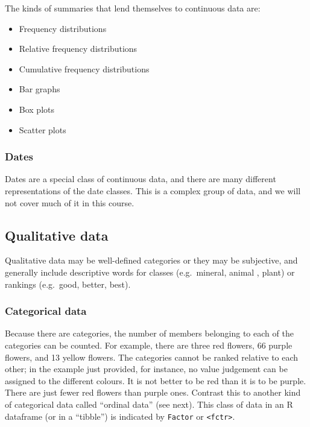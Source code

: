 \documentclass[english,10pt,a4paper,oneside]{book}
\providecommand{\tightlist}{%
  \setlength{\itemsep}{0pt}\setlength{\parskip}{0pt}}
\theoremstyle{definition}
\theoremstyle{definition}
\theoremstyle{definition}
\theoremstyle{remark}
\begin{document}
The kinds of summaries that lend themselves to continuous data are:

\begin{itemize}
\tightlist
\item
  Frequency distributions
\item
  Relative frequency distributions
\item
  Cumulative frequency distributions
\item
  Bar graphs
\item
  Box plots
\item
  Scatter plots
\end{itemize}

\subsubsection{Dates}\label{dates}

Dates are a special class of continuous data, and there are many
different representations of the date classes. This is a complex group
of data, and we will not cover much of it in this course.

\subsection{Qualitative data}\label{qualitative-data}

Qualitative data may be well-defined categories or they may be
subjective, and generally include descriptive words for classes
(e.g.~mineral, animal , plant) or rankings (e.g.~good, better, best).

\subsubsection{Categorical data}\label{categorical-data}

Because there are categories, the number of members belonging to each of
the categories can be counted. For example, there are three red flowers,
66 purple flowers, and 13 yellow flowers. The categories cannot be
ranked relative to each other; in the example just provided, for
instance, no value judgement can be assigned to the different colours.
It is not better to be red than it is to be purple. There are just fewer
red flowers than purple ones. Contrast this to another kind of
categorical data called \enquote{ordinal data} (see next). This class of
data in an R dataframe (or in a \enquote{tibble}) is indicated by
\texttt{Factor} or \texttt{\textless{}fctr\textgreater{}}.
\end{document}
